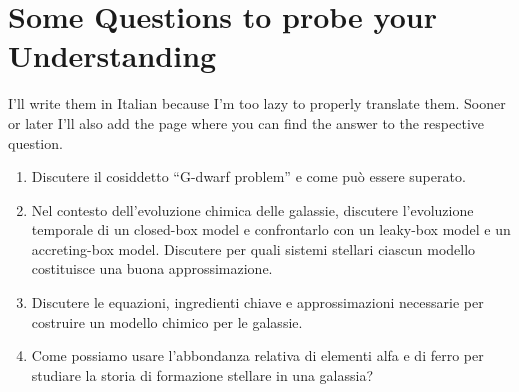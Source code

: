 \newpage
\section*{Some Questions to probe your Understanding}

I'll write them in Italian because I'm too lazy to properly translate them. Sooner or later I'll also add the page where you can find the answer to the respective question.

\begin{enumerate}
    \item Discutere il cosiddetto “G-dwarf problem” e come può essere superato.
    \item Nel contesto dell’evoluzione chimica delle galassie, discutere l’evoluzione temporale di un closed-box model e confrontarlo con un leaky-box model e un accreting-box model. Discutere per quali sistemi stellari ciascun modello costituisce una buona approssimazione.
    \item Discutere le equazioni, ingredienti chiave e approssimazioni necessarie per costruire un modello chimico per le galassie.
    \item Come possiamo usare l’abbondanza relativa di elementi alfa e di ferro per studiare la storia di formazione stellare in una galassia?
\end{enumerate}